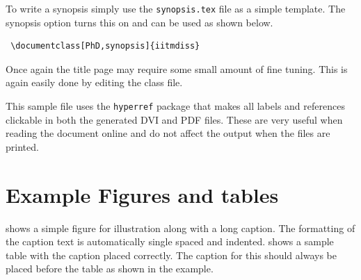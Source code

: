  To write a synopsis simply use the \verb+synopsis.tex+ file as a
 simple template.  The synopsis option turns this on and can be used as
 shown below.
 \begin{verbatim}
 \documentclass[PhD,synopsis]{iitmdiss}                                
 \end{verbatim}
 
 Once again the title page may require some small amount of fine
 tuning.  This is again easily done by editing the class file.
 
 This sample file uses the \verb+hyperref+ package that makes all
 labels and references clickable in both the generated DVI and PDF
 files.  These are very useful when reading the document online and do
 not affect the output when the files are printed.
 
 
 \section{Example Figures and tables}
 
  shows a simple figure for illustration along with
 a long caption.  The formatting of the caption text is automatically
 single spaced and indented.  shows a sample
 table with the caption placed correctly.  The caption for this should
 always be placed before the table as shown in the example.

